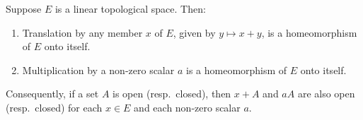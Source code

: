 Suppose $E$ is a linear topological space. Then:
\begin{enumerate}
\item[(a)] Translation by any member $x$ of $E$, given by $y \mapsto x + y$, is a homeomorphism of $E$ onto itself.
\item[(b)] Multiplication by a non-zero scalar $a$ is a homeomorphism of $E$ onto itself.
\end{enumerate}
Consequently, if a set $A$ is open (resp.\ closed), then $x + A$ and $aA$ are also open (resp.\ closed) for each $x \in E$ and each non-zero scalar $a$.
